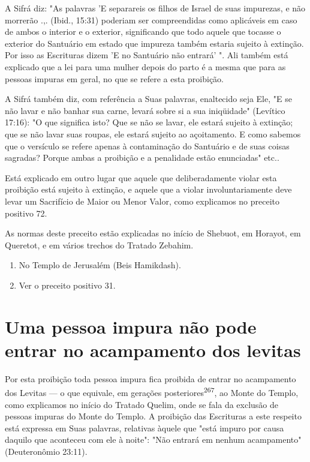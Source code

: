 A Sifrá diz: "As palavras 'E separareis os filhos de Israel de suas
im­purezas, e não morrerão .,. (Ibid., 15:31) poderiam ser compreendidas
como aplicáveis em caso de ambos o interior e o exterior, significando
que todo aquele que tocasse o exterior do Santuário em estado que
impureza também estaria sujeito à extinção. Por isso as Escrituras dizem
'E no Santuário não entrará' ". Ali também está explicado que a lei para
uma mulher depois do parto é a mes­ma que para as pessoas impuras em
geral, no que se refere a esta proibição.

A Sifrá também diz, com referência a Suas palavras, enaltecido seja Ele,
"E se não lavar e não banhar sua carne, levará sobre si a sua
iniqüidade" (Levítico 17:16): "O que significa isto? Que se não se
lavar, ele estará sujeito à extinção; que se não lavar suas roupas, ele
estará sujeito ao açoitamento. E como sabemos que o versículo se refere
apenas à contaminação do Santuário e de suas coisas sagradas? Porque
ambas a proibição e a penalidade estão enun­ciadas" etc..

Está explicado em outro lugar que aquele que deliberadamente vio­lar
esta proibição está sujeito à extinção, e aquele que a violar
involuntariamen­te deve levar um Sacrifício de Maior ou Menor Valor,
como explicamos no pre­ceito positivo 72.

As normas deste preceito estão explicadas no início de Shebuot, em
Horayot, em Queretot, e em vários trechos do Tratado Zebahim.


\begin{enumerate}
\def\labelenumi{\arabic{enumi}.}
\setcounter{enumi}{264}
\item
 
 No Templo de Jerusalém (Beis Hamikdash).
 
\item
 
 Ver o preceito positivo 31.
 
\end{enumerate}



\section{Uma pessoa impura não pode entrar no acampamento dos levitas}

Por esta proibição toda pessoa impura fica proibida de entrar no
acampamento dos Levitas --- o que equivale, em gerações
posteriores\textsuperscript{267}, ao Monte do Templo, como explicamos no
início do Tratado Quelim, onde se fa­la da exclusão de pessoas impuras
do Monte do Templo. A proibição das Escri­turas a este respeito está
expressa em Suas palavras, relativas àquele que "está impuro por causa
daquilo que aconteceu com ele à noite": "Não entrará em nenhum
acampamento" (Deuteronômio 23:11).

